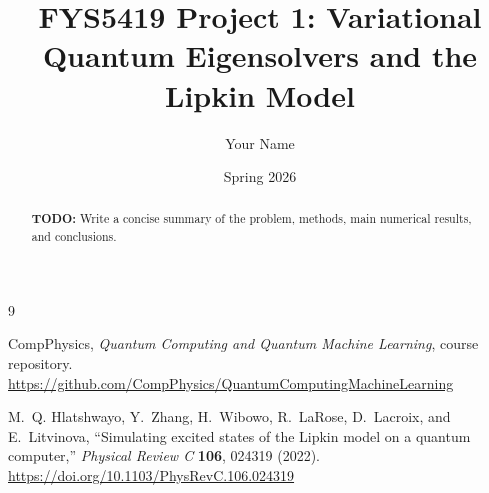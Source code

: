 \documentclass[11pt,a4paper]{article}
\title{FYS5419 Project 1: Variational Quantum Eigensolvers and the Lipkin Model}
\author{Your Name}
\date{Spring 2026}
\newcommand{\todo}[1]{\par\noindent\textcolor{red!70!black}{\textbf{TODO:} #1}\par}
\begin{document}
\maketitle

\begin{abstract}
\todo{Write a concise summary of the problem, methods, main numerical results, and conclusions.}
\end{abstract}

\tableofcontents
\newpage














\begin{thebibliography}{9}

CompPhysics, \emph{Quantum Computing and Quantum Machine Learning}, course repository.\newline
\url{https://github.com/CompPhysics/QuantumComputingMachineLearning}

M.~Q. Hlatshwayo, Y.~Zhang, H.~Wibowo, R.~LaRose, D.~Lacroix, and E.~Litvinova,
``Simulating excited states of the Lipkin model on a quantum computer,''
\emph{Physical Review C} \textbf{106}, 024319 (2022).\newline
\url{https://doi.org/10.1103/PhysRevC.106.024319}

\end{thebibliography}
\end{document}
